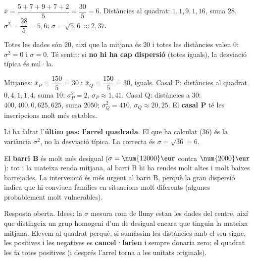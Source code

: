 \begin{solucions}
\begin{sollist}
  \item $\overline{x}=\dfrac{5+7+9+7+2}{5}=\dfrac{30}{5}=6$. Distàncies al quadrat:
        $1,1,9,1,16$, suma $28$. $\sigma^2=\dfrac{28}{5}=5,6$;
        $\sigma=\sqrt{5,6}\approx 2,37$.
  \item Totes les dades són $20$, així que la mitjana és $20$ i totes les distàncies
        valen $0$: $\sigma^2=0$ i $\sigma=0$. Té sentit: si \textbf{no hi ha cap
        dispersió} (totes iguals), la desviació típica és nul·la.
  \item Mitjanes: $\overline{x}_P=\dfrac{150}{5}=30$ i $\overline{x}_Q=\dfrac{150}{5}=30$,
        iguals. Casal P: distàncies al quadrat $0,4,1,1,4$, suma $10$;
        $\sigma_P^2=2$, $\sigma_P\approx 1,41$. Casal Q: distàncies a $30$:
        $400,400,0,625,625$, suma $\num{2050}$; $\sigma_Q^2=410$,
        $\sigma_Q\approx 20,25$. El \textbf{casal P} té les inscripcions molt més
        estables.
  \item Li ha faltat l'\textbf{últim pas: l'arrel quadrada}. El que ha calculat ($36$)
        és la variància $\sigma^2$, no la desviació típica. La correcta és
        $\sigma=\sqrt{36}=6$.
  \item El \textbf{barri B} és molt més desigual ($\sigma=\num{12000}\eur$ contra
        $\num{2000}\eur$): tot i la mateixa renda mitjana, al barri B hi ha rendes
        molt altes i molt baixes barrejades. La intervenció és més urgent al barri B,
        perquè la gran dispersió indica que hi conviuen famílies en situacions molt
        diferents (algunes probablement molt vulnerables).
  \item Resposta oberta. Idees: la $\sigma$ mesura com de lluny estan les dades del
        centre, així que distingeix un grup homogeni d'un de desigual encara que
        tinguin la mateixa mitjana. Elevem al quadrat perquè, si sumàssim les
        distàncies amb el seu signe, les positives i les negatives es
        \textbf{cancel·larien} i sempre donaria zero; el quadrat les fa totes
        positives (i després l'arrel torna a les unitats originals).
\end{sollist}
\end{solucions}
